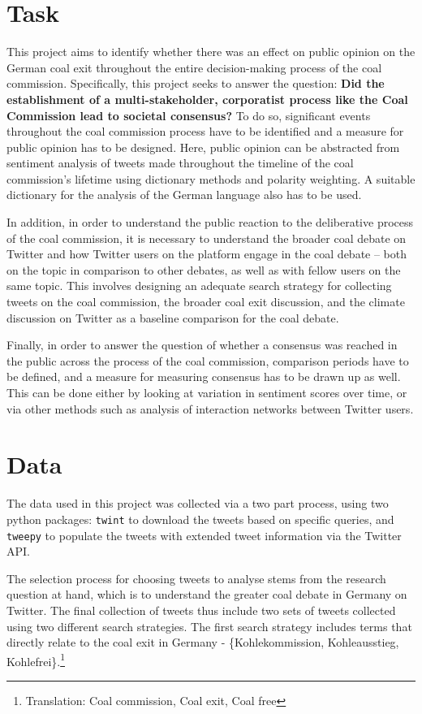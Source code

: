 \documentclass[12pt,onecolumn,twoside]{layout}
\begin{document}
\section{Task} \label{sec:task}
This project aims to identify whether there was an effect on public opinion on the German coal exit throughout the entire decision-making process of the coal commission. Specifically, this project seeks to answer the question: \textbf{Did the establishment of a multi-stakeholder, corporatist process like the Coal Commission lead to societal consensus?} To do so, significant events throughout the coal commission process have to be identified and a measure for public opinion has to be designed. Here, public opinion can be abstracted from sentiment analysis of tweets made throughout the timeline of the coal commission's lifetime using dictionary methods and polarity weighting. A suitable dictionary for the analysis of the German language also has to be used.

In addition, in order to understand the public reaction to the deliberative process of the coal commission, it is necessary to understand the broader coal debate on Twitter and how Twitter users on the platform engage in the coal debate -- both on the topic in comparison to other debates, as well as with fellow users on the same topic. This involves designing an adequate search strategy for collecting tweets on the coal commission, the broader coal exit discussion, and the climate discussion on Twitter as a baseline comparison for the coal debate.

Finally, in order to answer the question of whether a consensus was reached in the public across the process of the coal commission, comparison periods have to be defined, and a measure for measuring consensus has to be drawn up as well. This can be done either by looking at variation in sentiment scores over time, or via other methods such as analysis of interaction networks between Twitter users.

\section{Data} \label{sec:data}
The data used in this project was collected via a two part process, using two python packages: \texttt{twint} to download the tweets based on specific queries, and \texttt{tweepy} to populate the tweets with extended tweet information via the Twitter API.

The selection process for choosing tweets to analyse stems from the research question at hand, which is to understand the greater coal debate in Germany on Twitter. The final collection of tweets thus include two sets of tweets collected using two different search strategies. The first search strategy includes terms that directly relate to the coal exit in Germany - \{Kohlekommission, Kohleausstieg, Kohlefrei\}.\footnote{Translation: Coal commission, Coal exit, Coal free}
\end{document}
